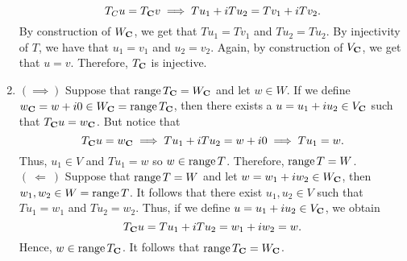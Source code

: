 \begin{solution}
\begin{enumerate}[label=(\alph*)]
        $$T_{C}u = T_{\mathbf{C}}v \implies Tu_1 + iTu_2 = Tv_1 + iTv_2.$$
        By construction of $W_{\mathbf{C}}$, we get that $Tu_1 = Tv_1$ and $Tu_2 = Tu_2$. By injectivity of $T$, we have that $u_1 = v_1$ and $u_2 = v_2$. Again, by construction of $V_{\mathbf{C}}$, we get that $u = v$. Therefore, $T_{\mathbf{C}}$ is injective. 
        \item $(\implies)$ Suppose that $\operatorname{\text{range}} T_{\mathbf{C}} = W_{\mathbf{C}}$ and let $w \in W$. If we define $w_{\mathbf{C}} = w + i0 \in W_{\mathbf{C}} = \operatorname{\text{range}} T_{\mathbf{C}}$, then there exists a $u = u_1 + iu_2 \in V_{\mathbf{C}}$ such that $T_{\mathbf{C}}u = w_{\mathbf{C}}$. But notice that
        $$T_{\mathbf{C}}u = w_{\mathbf{C}} \implies Tu_1 + iTu_2 = w + i0 \implies Tu_1 = w.$$
        Thus, $u_1 \in V$ and $Tu_1 = w$ so $w \in \operatorname{\text{range}} T$. Therefore, $\operatorname{\text{range}} T = W$. \\
        $( \ \Longleftarrow \ )$ Suppose that $\operatorname{\text{range}} T = W$ and let $w = w_1 + iw_2 \in W_{\mathbf{C}}$, then $w_1, w_2 \in W = \operatorname{\text{range}} T$. It follows that there exist $u_1, u_2 \in V$ such that $Tu_1 = w_1$ and $Tu_2 = w_2$. Thus, if we define $u = u_1 + iu_2 \in V_{\mathbf{C}}$, we obtain
        $$T_{\mathbf{C}}u = Tu_1 + iTu_2 = w_1 + iw_2 = w.$$
        Hence, $w \in \operatorname{\text{range}} T_{\mathbf{C}}$. It follows that $\operatorname{\text{range}} T_{\mathbf{C}} = W_{\mathbf{C}}$. 
    \end{enumerate}
\end{solution}
